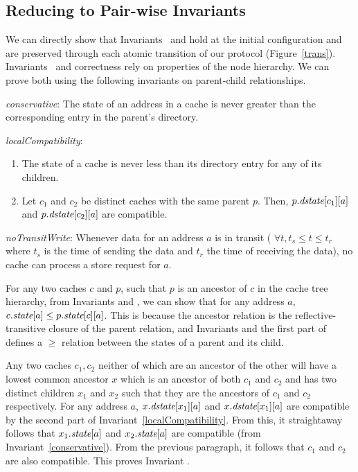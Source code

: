 \subsection{Reducing to Pair-wise Invariants}
\label{pairwise}

We can directly show that Invariants~ and
 hold at the initial configuration and are
preserved through each atomic transition of our protocol
(Figure~\ref{trans}). Invariants~ and
 correctness rely on properties of the node
hierarchy. We can prove both using the following invariants on
parent-child relationships.

\begin{inv}
\textit{conservative}: The state of an address in a cache is never greater than
the corresponding entry in the parent's directory.
\label{conservative}
\end{inv}

\begin{inv}
\textit{localCompatibility}:
\begin{enumerate}
\item The state of a cache is never less than its directory entry for any of
its children.
\item Let $c_1$ and $c_2$ be distinct caches with the same parent $p$. Then,
$p.\textit{dstate}[c_1][a]$ and $p.\textit{dstate}[c_2][a]$ are compatible.
\end{enumerate}
\label{localCompatibility}
\end{inv}

\begin{inv}
\textit{noTransitWrite}: Whenever data for an address $a$ is in transit (\ie{}
$\forall t, t_s \le t \le t_r$ where $t_s$ is the time of sending the data and
$t_r$ the time of receiving the data), no cache can process a store request for
$a$.
\label{noTransitWrite}
\end{inv}

For any two caches $c$ and $p$, such that $p$ is an ancestor of $c$ in
the cache tree hierarchy, from Invariants  and
, we can show that for any address $a$,
$c.\textit{state}[a] \le p.\textit{state}[c][a]$. This is because the ancestor
relation is the reflective-transitive closure of the parent relation,
and Invariants  and the first part
 of defines a $\ge$ relation between the
states of a parent and its child.

Any two caches $c_1, c_2$ neither of which are an ancestor of the
other will have a lowest common ancestor $x$ which is an ancestor of
both $c_1$ and $c_2$ and has two distinct children $x_1$ and $x_2$
such that they are the ancestors of $c_1$ and $c_2$ respectively. For
any address $a$, $x.\textit{dstate}[x_1][a]$ and $x.\textit{dstate}[x_1][a]$ are
compatible by the second part of
Invariant~\ref{localCompatibility}. From this, it straightaway follows
that $x_1.\textit{state}[a]$ and $x_2.\textit{state}[a]$ are compatible (from
Invariant~\ref{conservative}). From the previous paragraph, it follows
that $c_1$ and $c_2$ are also compatible. This proves
Invariant .

